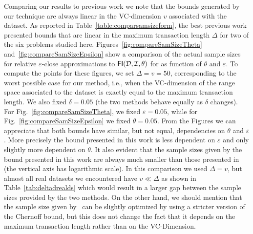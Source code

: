 Comparing our results to previous work we note that the bounds generated by our
technique are always linear in the VC-dimension $v$ associated with the dataset.
As reported in Table~\ref{table:comparsamsizeform}, the best previous
work~\cite{ChakaravarthyPS09} presented bounds that are linear in the maximum
transaction length $\Delta$ for two of the six problems studied here.
Figures~\ref{fig:compareSamSizeTheta} and~\ref{fig:compareSamSizeEpsilon} show
a comparison of the actual sample sizes for relative $\varepsilon$-close
approximations to $\mathsf{FI}({\cal D},{\cal I},\theta)$ for as function of $\theta$ and
$\varepsilon$. To compute the points for these figures, we set $\Delta=v=50$,
corresponding to the worst possible case for our method, i.e., when the
VC-dimension of the range space associated to the dataset is exactly equal to
the maximum transaction length. We also fixed $\delta=0.05$ (the two methods
behave equally as $\delta$ changes). For Fig.~\ref{fig:compareSamSizeTheta}, we
fixed $\varepsilon=0.05$, while for Fig.~\ref{fig:compareSamSizeEpsilon} we
fixed $\theta=0.05$. From the Figures we can appreciate that both bounds have
similar, but not equal, dependencies on $\theta$ and $\varepsilon$. More
precisely the bound presented in this work is less dependent on $\varepsilon$
and only slightly more dependent on $\theta$. It also evident that the sample
sizes given by the bound presented in this work are always much smaller than
those presented in~\cite{ChakaravarthyPS09} (the vertical axis has logarithmic
scale). In this comparison we used $\Delta=v$, but almost all real datasets
we encountered have $v\ll\Delta$ as shown in Table~\ref{tab:deltadrealds} which
would result in a larger gap between the sample sizes provided by the two
methods. On the other hand, we should mention that the sample size given
by~\cite{ChakaravarthyPS09} can be slightly optimized by using a stricter
version of the Chernoff bound, but this does not change the fact that it
depends on the maximum transaction length rather than on the VC-Dimension.

